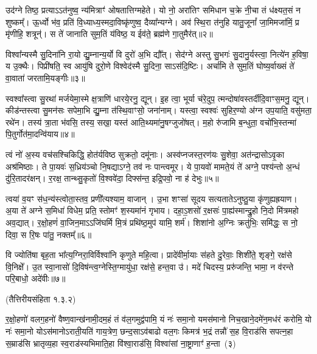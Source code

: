 उद॑ग्ने तिष्ठ॒ प्रत्याऽऽत॑नुष्व॒ न्य॑मित्राꣳ॑ ओषतात्तिग्महेते। यो नो॒ अरा॑तिꣳ समिधान च॒क्रे नी॒चा तं ध॑क्ष्यत॒सं न शुष्कम्᳚। ऊ॒र्ध्वो भ॑व॒ प्रति॑ वि॒ध्याध्य॒स्मदा॒विष्कृ॑णुष्व॒ दैव्या᳚न्यग्ने। अव॑ स्थि॒रा त॑नुहि यातु॒जूनां᳚ जा॒मिमजा॑मिं॒ प्र मृ॑णीहि॒ शत्रून्॑। स ते॑ जानाति सुम॒तिं य॑विष्ठ॒ य ईव॑ते॒ ब्रह्म॑णे गा॒तुमैर॑त्॥२॥

 विश्वा᳚न्यस्मै सु॒दिना॑नि रा॒यो द्यु॒म्नान्य॒र्यो वि दुरो॑ अ॒भि द्यौ᳚त्। सेद॑ग्ने अस्तु सु॒भगः॑ सु॒दानु॒र्यस्त्वा॒ नित्ये॑न ह॒विषा॒ य उ॒क्थैः। पिप्री॑षति॒ स्व आयु॑षि दुरो॒णे विश्वेद॑स्मै सु॒दिना॒ साऽस॑दि॒ष्टिः। अर्चा॑मि ते सुम॒तिं घोष्य॒र्वाख्सं ते॑ वा॒वाता॑ जरतामि॒यङ्गीः॥३॥
 
स्वश्वा᳚स्त्वा सु॒रथा॑ मर्जयेमा॒स्मे क्ष॒त्राणि॑ धारये॒रनु॒ द्यून्। इ॒ह त्वा॒ भूर्या च॑रे॒दुप॒ त्मन्दोषा॑\-वस्तर्दीदि॒वाꣳ\-स॒मनु॒ द्यून्। कीड॑न्तस्त्वा सु॒मन॑सः सपेमा॒भि द्यु॒म्ना त॑स्थि॒वाꣳसो॒ जना॑नाम्। यस्त्वा॒ स्वश्वः॑ सुहिर॒ण्यो अ॑ग्न उप॒याति॒ वसु॑मता॒ रथे॑न। तस्य॑ त्रा॒ता भ॑वसि॒ तस्य॒ सखा॒ यस्त॑ आति॒थ्यमा॑नु॒षग्जुजो॑षत्। म॒हो रु॑जामि ब॒न्धुता॒ वचो॑भि॒स्तन्मा॑ पि॒तुर्गोत॑मा॒दन्वि॑याय॥४॥

 त्वं नो॑ अ॒स्य वच॑सश्चिकिद्धि॒ होत॑र्यविष्ठ सुक्रतो॒ दमू॑नाः। अस्व॑प्नजस्त॒रण॑यः सु॒शेवा॒ अत॑न्द्रासोऽवृ॒का अश्र॑मिष्ठाः। ते पा॒यवः॑ स॒ध्रिय॑ञ्चो नि॒षद्याऽग्ने॒ तव॑ नः पान्त्वमूर। ये पा॒यवो॑ मामते॒यं ते॑ अग्ने॒ पश्य॑न्तो अ॒न्धं दु॑रि॒तादर॑क्षन्। र॒रक्ष॒ तान्थ्सु॒कृतो॑ वि॒श्ववे॑दा॒ दिफ्स॑न्त॒ इद्रि॒पवो॒ ना ह॑ देभुः॥५॥
 
त्वया॑ व॒यꣳ स॑ध॒न्य॑स्त्वोता॒स्तव॒ प्रणी᳚त्यश्याम॒ वाजान्। उ॒भा शꣳसा॑ सूदय सत्यतातेऽनुष्ठु॒या कृ॑णुह्यह्रयाण। अ॒या ते॑ अग्ने स॒मिधा॑ विधेम॒ प्रति॒ स्तोमꣳ॑ श॒स्यमा॑नं गृभाय। दहा॒ऽ॒शसो॑ र॒क्षसः॑ पा॒ह्य॑स्मान्द्रु॒हो नि॒दो मि॑त्रमहो अव॒द्यात्। र॒क्षो॒हणं॑ वा॒जिन॒माऽऽजि॑घर्मि मि॒त्रं प्रथि॑ष्ठ॒मुप॑ यामि॒ शर्म॑। शिशा॑नो अ॒ग्निः क्रतु॑भिः॒ समि॑द्धः॒ स नो॒ दिवा॒ स रि॒षः पा॑तु॒ नक्तम्᳚॥६॥

 वि ज्योति॑षा बृह॒ता भा᳚त्य॒ग्निरा॒विर्विश्वा॑नि कृणुते महि॒त्वा। प्रादे॑वीर्मा॒याः स॑हते दु॒रेवाः॒ शिशी॑ते॒ शृङ्गे॒ रक्ष॑से वि॒निक्षे᳚। उ॒त स्वा॒नासो॑ दि॒विष॑न्त्व॒ग्नेस्ति॒ग्मायु॑धा॒ रक्ष॑से॒ हन्त॒वा उ॑। मदे॑ चिदस्य॒ प्ररु॑जन्ति॒ भामा॒ न व॑रन्ते परि॒बाधो॒ अदे॑वीः॥७॥

\centerline{\scriptsize (तैत्तिरीयसंहिता १.३.२)}

र॒क्षो॒हणो॑ वलग॒हनो॑ वैष्ण॒वान्ख॑नामी॒दम॒हं तं व॑ल॒गमुद्व॑पामि॒ यं नः॑ समा॒नो यमस॑मानो निच॒खाने॒दमे॑न॒मध॑रं करोमि॒ यो नः॑ समा॒नो यो\-ऽस॑मानो\-ऽराती॒यति॑ गाय॒त्रेण॒ छन्द॒सा\-ऽव॑बाढो वल॒गः किमत्र॑ भ॒द्रं तन्नौ॑ स॒ह वि॒राड॑सि सपत्न॒हा स॒म्राड॑सि भ्रातृव्य॒हा स्व॒राड॑स्यभिमाति॒हा वि॑श्वा॒राड॑सि॒ विश्वा॑सां ना॒ष्ट्राणाꣳ॑ ह॒न्ता~(३)


